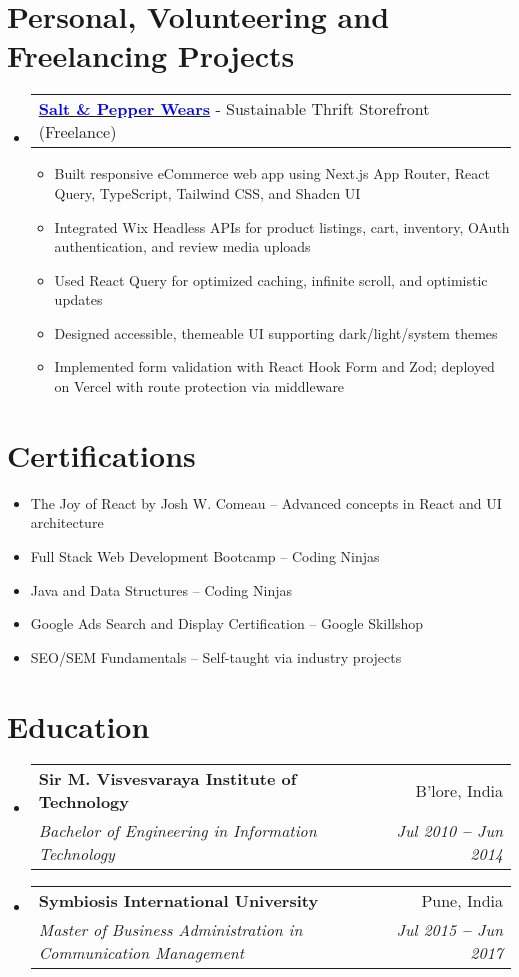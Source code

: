 \documentclass[letterpaper,11pt]{article}
\makeatletter
\newcommand{\resumeItem}[1]{
  \item\small{
    {#1 \vspace{-2pt}}
  }
}
\newcommand{\resumeSubheading}[4]{
  \vspace{-2pt}\item
    \begin{tabular*}{0.97\textwidth}[t]{l@{\extracolsep{\fill}}r}
      \textbf{#1} & #2 \\
      \textit{\small#3} & \textit{\small #4} \\
    \end{tabular*}\vspace{-7pt}
}
\newcommand{\resumeProjectHeading}[2]{
    \vspace{-2pt}\item
    \begin{tabular*}{0.97\textwidth}{l@{\extracolsep{\fill}}r}
      \small#1 & #2 \\
    \end{tabular*}\vspace{-7pt}
}
\newcommand{\resumeSubHeadingListStart}{\begin{itemize}[leftmargin=0.15in, label={}]}
\newcommand{\resumeSubHeadingListEnd}{\end{itemize}}
\newcommand{\resumeItemListStart}{\begin{itemize}}
\newcommand{\resumeItemListEnd}{\end{itemize}\vspace{-5pt}}
\makeatother
\begin{document}

\section{Personal, Volunteering and Freelancing Projects}
\vspace{3pt}
\resumeSubHeadingListStart

\resumeProjectHeading
{\textbf{\href{https://saltandpepper.vercel.app/}{\textcolor{blue}{Salt \& Pepper Wears}}} - Sustainable Thrift Storefront (Freelance)}{}
\resumeItemListStart
\resumeItem{Built responsive eCommerce web app using Next.js App Router, React Query, TypeScript, Tailwind CSS, and Shadcn UI}
\resumeItem{Integrated Wix Headless APIs for product listings, cart, inventory, OAuth authentication, and review media uploads}
\resumeItem{Used React Query for optimized caching, infinite scroll, and optimistic updates}
\resumeItem{Designed accessible, themeable UI supporting dark/light/system themes}
\resumeItem{Implemented form validation with React Hook Form and Zod; deployed on Vercel with route protection via middleware}
\resumeItemListEnd


\resumeSubHeadingListEnd



{\small
\section{Certifications}
\vspace{2pt}
\resumeSubHeadingListStart
  \resumeItemListStart
    \resumeItem{The Joy of React by Josh W. Comeau – Advanced concepts in React and UI architecture}
    \resumeItem{Full Stack Web Development Bootcamp – Coding Ninjas}
    \resumeItem{Java and Data Structures – Coding Ninjas}
    \resumeItem{Google Ads Search and Display Certification – Google Skillshop}
    \resumeItem{SEO/SEM Fundamentals – Self-taught via industry projects}
  \resumeItemListEnd
\resumeSubHeadingListEnd
}



\section{Education}
\vspace{3pt}
\resumeSubHeadingListStart
\resumeSubheading
{Sir M. Visvesvaraya Institute of Technology}{B'lore, India}
{Bachelor of  Engineering in Information Technology}{Jul 2010 \textbf{--} Jun 2014}
\resumeSubheading
{Symbiosis International University}{Pune, India}
{Master of Business Administration in Communication Management}{Jul 2015 \textbf{--} Jun 2017}
\resumeSubHeadingListEnd

\end{document}
